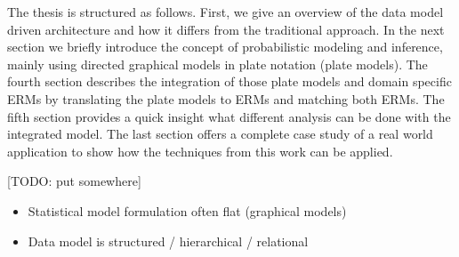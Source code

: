 The thesis is structured as follows. First, we give an overview of the data model driven architecture and how it differs from the traditional approach. In the next section we briefly introduce the concept of probabilistic modeling and inference, mainly using directed graphical models in plate notation (plate models). The fourth section describes the integration of those plate models and domain specific ERMs by translating the plate models to ERMs and matching both ERMs. The fifth section provides a quick insight what different analysis can be done with the integrated model. The last section offers a complete case study of a real world application to show how the techniques from this work can be applied.

[TODO: put somewhere]
\begin{itemize}
\item Statistical model formulation often flat (graphical models)
\item Data model is structured / hierarchical / relational
\end{itemize}
